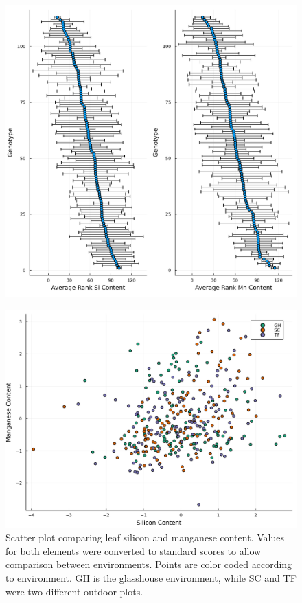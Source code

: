 \documentclass[12pt, letterpaper, ]{report}
\begin{document}
\begin{figure}[h]
        \includegraphics[scale=0.048]{images/rank_plots.png}
        \centering
        \caption{}
        \label{Fig:mn_si_regression}
\end{figure}

\begin{figure}[h]
        \includegraphics[scale=0.048]{images/si_mn_regression.png}
        \centering
        \caption{Scatter plot comparing leaf silicon and manganese content. Values for both elements were converted to standard scores to allow
        comparison between environments. Points are color coded according to environment. GH is the glasshouse environment, while SC and TF were two different outdoor plots.}
        \label{Fig:mn_si_regression}
\end{figure}
\end{document}
